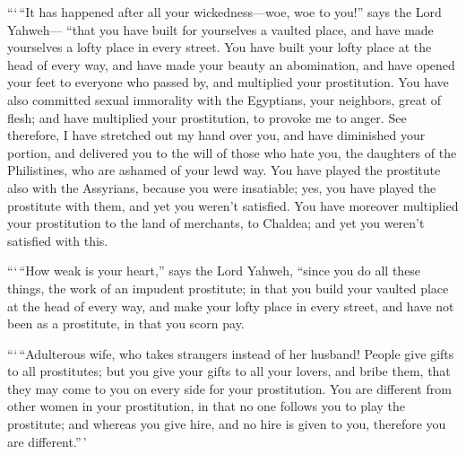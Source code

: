  ```\,``It has happened after all your wickedness---woe,
woe to you!'' says the Lord Yahweh---  ``that you have
built for yourselves a vaulted place, and have made yourselves a lofty
place in every street.  You have built your lofty place at
the head of every way, and have made your beauty an abomination, and
have opened your feet to everyone who passed by, and multiplied your
prostitution.  You have also committed sexual immorality
with the Egyptians, your neighbors, great of flesh; and have multiplied
your prostitution, to provoke me to anger.  See therefore,
I have stretched out my hand over you, and have diminished your portion,
and delivered you to the will of those who hate you, the daughters of
the Philistines, who are ashamed of your lewd way.  You
have played the prostitute also with the Assyrians, because you were
insatiable; yes, you have played the prostitute with them, and yet you
weren't satisfied.  You have moreover multiplied your
prostitution to the land of merchants, to Chaldea; and yet you weren't
satisfied with this.

 ```\,``How weak is your heart,'' says the Lord Yahweh,
``since you do all these things, the work of an impudent prostitute;
 in that you build your vaulted place at the head of every
way, and make your lofty place in every street, and have not been as a
prostitute, in that you scorn pay.

 ```\,``Adulterous wife, who takes strangers instead of her
husband!  People give gifts to all prostitutes; but you
give your gifts to all your lovers, and bribe them, that they may come
to you on every side for your prostitution.  You are
different from other women in your prostitution, in that no one follows
you to play the prostitute; and whereas you give hire, and no hire is
given to you, therefore you are different.''\,'

